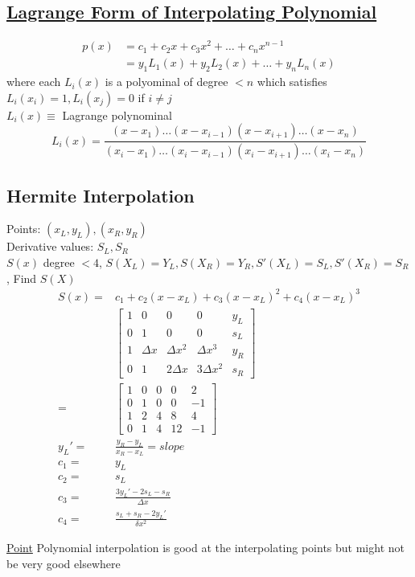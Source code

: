 \documentclass[10pt,usletter]{article}
\begin{document}
\subsection{\underline{Lagrange Form of Interpolating Polynomial}}
\begin{align*}
p(x)&=c_1+c_2x+c_3x^2+\hdots+c_nx^{n-1}\\
&=y_1L_1(x)+y_2L_2(x)+\hdots + y_nL_n(x)
\end{align*}
where each $L_i(x)$ is a polyominal of degree $<n$ which satisfies $L_i(x_i)=1, L_i(x_j)=0$ if $i \neq j$\\
$L_i(x)\equiv$ Lagrange polynominal
$$L_i(x)=\frac{(x-x_1)\hdots (x-x_{i-1})(x-x_{i+1})\hdots (x-x_n)}{(x_i-x_1)\hdots (x_i-x_{i-1})(x_i-x_{i+1})\hdots (x_i-x_n)}$$

\subsection{Hermite Interpolation}
Points: $(x_L,y_L),(x_R,y_R)$\\
Derivative values: $S_L, S_R$\\
$S(x)$ degree $<4$, $S(X_L)=Y_L,S(X_R)=Y_R, S'(X_L)=S_L, S'(X_R)=S_R$, Find $S(X)$
\begin{align*}
S(x) =& c_1+c_2(x-x_L)+c_3(x-x_L)^2+c_4(x-x_L)^3\\
&\begin{bmatrix}
1 & 0 & 0 & 0 & y_L\\
0 & 1 & 0 & 0 & s_L\\
1 & \Delta x & \Delta x^2 & \Delta x^3 & y_R\\
0 & 1 & 2 \Delta x & 3 \Delta x^2 &s_R
\end{bmatrix}\\
=&
\begin{bmatrix}
1 & 0 & 0 & 0 & 2\\
0 & 1 & 0 & 0 & -1\\
1 & 2 & 4 & 8 & 4\\
0 & 1 & 4 & 12 & -1
\end{bmatrix}\\
y_L'=&\frac{y_R-y_L}{x_R-x_L}=slope\\
c_1=&y_L\\
c_2=&s_L\\
c_3=&\frac{3y_L'-2s_L-s_R}{\Delta x}\\
c_4=&\frac{s_L+s_R-2y_L'}{\delta	x^2}
\end{align*}

\underline{Point} Polynomial interpolation is good at the interpolating points but might not be very good elsewhere
\end{document}
